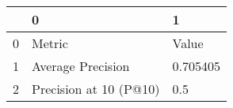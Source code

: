 \begin{tabular}{lll}
\toprule
{} &                       0 &         1 \\
\midrule
0 &                  Metric &     Value \\
1 &       Average Precision &  0.705405 \\
2 &  Precision at 10 (P@10) &       0.5 \\
\bottomrule
\end{tabular}
